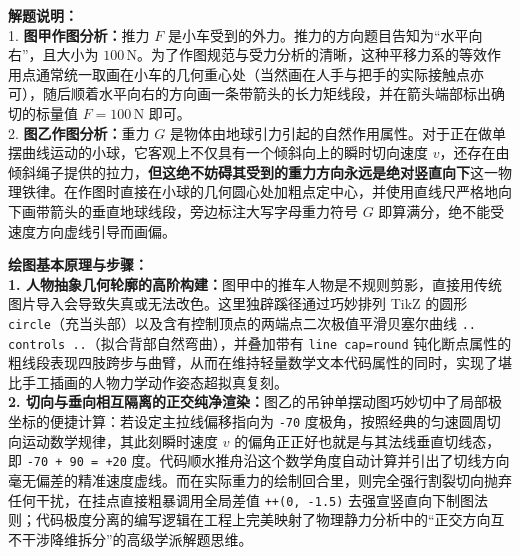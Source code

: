 \documentclass[12pt, a4paper]{ctexrep}
\begin{document}
\begin{center}
\end{center}

\vspace{0.6cm}

{\small\color{gray}
\textbf{解题说明：}\\
1. \textbf{图甲作图分析：}推力 $F$ 是小车受到的外力。推力的方向题目告知为“水平向右”，且大小为 $100\,\text{N}$。为了作图规范与受力分析的清晰，这种平移力系的等效作用点通常统一取画在小车的几何重心处（当然画在人手与把手的实际接触点亦可），随后顺着水平向右的方向画一条带箭头的长力矩线段，并在箭头端部标出确切的标量值 $F = 100\,\text{N}$ 即可。\\
2. \textbf{图乙作图分析：}重力 $G$ 是物体由地球引力引起的自然作用属性。对于正在做单摆曲线运动的小球，它客观上不仅具有一个倾斜向上的瞬时切向速度 $v$，还存在由倾斜绳子提供的拉力，\textbf{但这绝不妨碍其受到的重力方向永远是绝对竖直向下}这一物理铁律。在作图时直接在小球的几何圆心处加粗点定中心，并使用直线尺严格地向下画带箭头的垂直地球线段，旁边标注大写字母重力符号 $G$ 即算满分，绝不能受速度方向虚线引导而画偏。
}

\vspace{0.6cm}

{\small\color{blue!70!black}
\textbf{绘图基本原理与步骤：}\\
\textbf{1. 人物抽象几何轮廓的高阶构建：}图甲中的推车人物是不规则剪影，直接用传统图片导入会导致失真或无法改色。这里独辟蹊径通过巧妙排列 TikZ 的圆形 \texttt{circle}（充当头部）以及含有控制顶点的两端点二次极值平滑贝塞尔曲线 \texttt{.. controls ..}（拟合背部自然弯曲），并叠加带有 \texttt{line cap=round} 钝化断点属性的粗线段表现四肢跨步与曲臂，从而在维持轻量数学文本代码属性的同时，实现了堪比手工插画的人物力学动作姿态超拟真复刻。\\
\textbf{2. 切向与垂向相互隔离的正交纯净渲染：}图乙的吊钟单摆动图巧妙切中了局部极坐标的便捷计算：若设定主拉线偏移指向为 \texttt{-70} 度极角，按照经典的匀速圆周切向运动数学规律，其此刻瞬时速度 $v$ 的偏角正正好也就是与其法线垂直切线态，即 \texttt{-70 + 90 = +20} 度。代码顺水推舟沿这个数学角度自动计算并引出了切线方向毫无偏差的精准速度虚线。而在实际重力的绘制回合里，则完全强行割裂切向抛弃任何干扰，在挂点直接粗暴调用全局差值 \texttt{++(0, -1.5)} 去强宣竖直向下制图法则；代码极度分离的编写逻辑在工程上完美映射了物理静力分析中的“正交方向互不干涉降维拆分”的高级学派解题思维。
}
\end{document}
